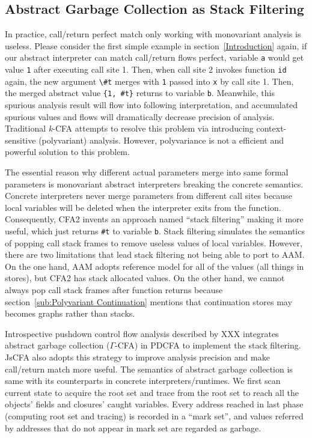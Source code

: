 \documentclass{article}
\begin{document}
\subsection{Abstract Garbage Collection as Stack Filtering}
\label{sub:Abstract Garbage Collection as Stack Filtering}
In practice, call/return perfect match only working with monovariant analysis is useless. Please consider the first simple example in section~\ref{Introduction} again, if our abstract interpreter can match call/return flows perfect, variable \verb|a| would get value \verb|1| after executing call site 1. Then, when call site 2 invokes function \verb|id| again, the new argument \verb|\#t| merges with \verb|1| passed into \verb|x| by call site 1. Then, the merged abstract value \verb|{1, #t}| returns to variable \verb|b|.
Meanwhile, this spurious analysis result will flow into following interpretation, and accumulated spurious values and flows will dramatically decrease precision of analysis.
Traditional \textit{k}-CFA attempts to resolve this problem via introducing context-sensitive (polyvariant) analysis. However, polyvariance is not a efficient and powerful solution to this problem.

The essential reason why different actual parameters merge into same formal parameters is monovariant abstract interpreters breaking the concrete semantics. Concrete interpreters never merge parameters from different call sites because local variables will be deleted when the interpreter exits from the function.
Consequently, CFA2 invents an approach named ``stack filtering'' making it more useful, which just returns \verb|#t| to variable \verb|b|. Stack filtering simulates the semantics of popping call stack frames to remove useless values of local variables. However, there are two limitations that lead stack filtering not being able to port to AAM\@. On the one hand, AAM adopts reference model for all of the values (all things in stores), but CFA2 has stack allocated values. On the other hand, we cannot always pop call stack frames after function returns because section~\ref{sub:Polyvariant Continuation} mentions that continuation stores may becomes graphs rather than stacks.

Introspective pushdown control flow analysis described by XXX integrates abstract garbage collection ($\Gamma$-CFA) in PDCFA to implement the stack filtering. JsCFA also adopts this strategy to improve analysis precision and make call/return match more useful. The semantics of abstract garbage collection is same with its counterparts in concrete interpreters/runtimes.
We first scan current state to acquire the root set and trace from the root set to reach all the objects' fields and closures' caught variables. Every address reached in last phase (computing root set and tracing) is recorded in a ``mark set'', and values referred by addresses that do not appear in mark set are regarded as garbage.
\end{document}
